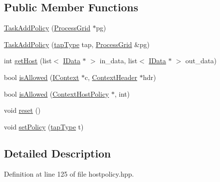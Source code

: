 \subsection*{Public Member Functions}
\begin{DoxyCompactItemize}
\item 
\hyperlink{class_task_add_policy_ac1a8ac8ea73840de78c4f82df7b58895}{TaskAddPolicy} (\hyperlink{class_process_grid}{ProcessGrid} $\ast$pg)
\item 
\hyperlink{class_task_add_policy_a89b4e830d38115ef42d915c898d58268}{TaskAddPolicy} (\hyperlink{class_task_add_policy_afd8e033ef8b047a0df5c558cae84283e}{tapType} tap, \hyperlink{class_process_grid}{ProcessGrid} \&pg)
\item 
int \hyperlink{class_task_add_policy_af4a2055c79d1605f4099bdec7f4429f2}{getHost} (list$<$ \hyperlink{class_i_data}{IData} $\ast$ $>$ in\_\-data, list$<$ \hyperlink{class_i_data}{IData} $\ast$ $>$ out\_\-data)
\item 
bool \hyperlink{class_task_add_policy_a80261d7262611c29d2b483e4e73cc204}{isAllowed} (\hyperlink{class_i_context}{IContext} $\ast$c, \hyperlink{class_context_header}{ContextHeader} $\ast$hdr)
\item 
bool \hyperlink{class_task_add_policy_a16f3ac4d4bf719e3020a4495d7498c3e}{isAllowed} (\hyperlink{class_context_host_policy}{ContextHostPolicy} $\ast$, int)
\item 
void \hyperlink{class_task_add_policy_a5ce62af8541c3e3001d5b373799c1228}{reset} ()
\item 
void \hyperlink{class_task_add_policy_a6fa0ab3a3c239febfe7de3da0117f96f}{setPolicy} (\hyperlink{class_task_add_policy_afd8e033ef8b047a0df5c558cae84283e}{tapType} t)
\end{DoxyCompactItemize}


\subsection{Detailed Description}


Definition at line 125 of file hostpolicy.hpp.

